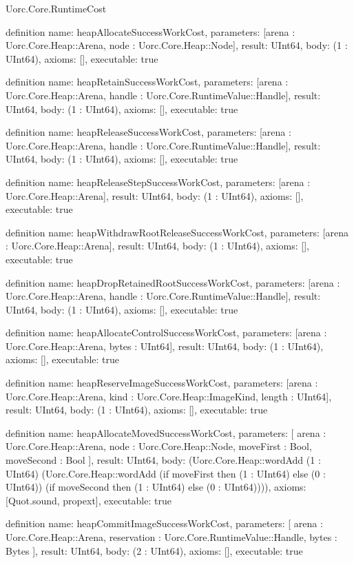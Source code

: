 \begin{lexlean}{Uorc.Core.RuntimeCost}
\begin{semanticmodule}
definition{
  name: heapAllocateSuccessWorkCost,
  parameters: [arena : Uorc.Core.Heap::Arena, node : Uorc.Core.Heap::Node],
  result: UInt64,
  body: (1 : UInt64),
  axioms: [],
  executable: true
}

definition{
  name: heapRetainSuccessWorkCost,
  parameters: [arena : Uorc.Core.Heap::Arena, handle : Uorc.Core.RuntimeValue::Handle],
  result: UInt64,
  body: (1 : UInt64),
  axioms: [],
  executable: true
}

definition{
  name: heapReleaseSuccessWorkCost,
  parameters: [arena : Uorc.Core.Heap::Arena, handle : Uorc.Core.RuntimeValue::Handle],
  result: UInt64,
  body: (1 : UInt64),
  axioms: [],
  executable: true
}

definition{
  name: heapReleaseStepSuccessWorkCost,
  parameters: [arena : Uorc.Core.Heap::Arena],
  result: UInt64,
  body: (1 : UInt64),
  axioms: [],
  executable: true
}

definition{
  name: heapWithdrawRootReleaseSuccessWorkCost,
  parameters: [arena : Uorc.Core.Heap::Arena],
  result: UInt64,
  body: (1 : UInt64),
  axioms: [],
  executable: true
}

definition{
  name: heapDropRetainedRootSuccessWorkCost,
  parameters: [arena : Uorc.Core.Heap::Arena, handle : Uorc.Core.RuntimeValue::Handle],
  result: UInt64,
  body: (1 : UInt64),
  axioms: [],
  executable: true
}

definition{
  name: heapAllocateControlSuccessWorkCost,
  parameters: [arena : Uorc.Core.Heap::Arena, bytes : UInt64],
  result: UInt64,
  body: (1 : UInt64),
  axioms: [],
  executable: true
}

definition{
  name: heapReserveImageSuccessWorkCost,
  parameters: [arena : Uorc.Core.Heap::Arena, kind : Uorc.Core.Heap::ImageKind, length : UInt64],
  result: UInt64,
  body: (1 : UInt64),
  axioms: [],
  executable: true
}

definition{
  name: heapAllocateMovedSuccessWorkCost,
  parameters: [
    arena : Uorc.Core.Heap::Arena,
    node : Uorc.Core.Heap::Node,
    moveFirst : Bool,
    moveSecond : Bool
  ],
  result: UInt64,
  body: (Uorc.Core.Heap::wordAdd (1 : UInt64) (Uorc.Core.Heap::wordAdd (if moveFirst then (1 : UInt64) else (0 : UInt64)) (if moveSecond then (1 : UInt64) else (0 : UInt64)))),
  axioms: [Quot.sound, propext],
  executable: true
}

definition{
  name: heapCommitImageSuccessWorkCost,
  parameters: [
    arena : Uorc.Core.Heap::Arena,
    reservation : Uorc.Core.RuntimeValue::Handle,
    bytes : Bytes
  ],
  result: UInt64,
  body: (2 : UInt64),
  axioms: [],
  executable: true
}


\end{semanticmodule}
\end{lexlean}
